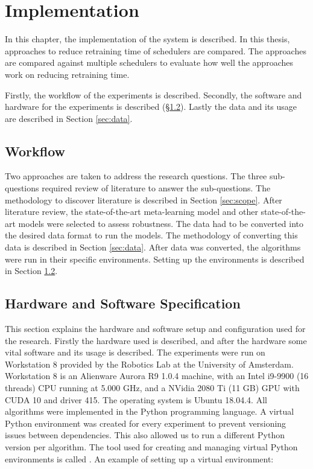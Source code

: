 \chapter{Implementation}\label{sec:method}

In this chapter, the implementation of the system is described. In this
thesis, approaches to reduce retraining time of \rlbased schedulers are
compared. The approaches are compared against multiple \rlbased schedulers to
evaluate how well the approaches work on reducing retraining time.

Firstly, the workflow of the experiments is described. Secondly, the software
and hardware for the experiments is described (§\ref{sec:setup}). Lastly the
data and its usage are described in Section \ref{sec:data}.

\section{Workflow}

Two approaches are taken to address the research questions. The three
sub-questions required review of literature to answer the sub-questions. The
methodology to discover literature is described in Section \ref{sec:scope}.
After literature review, the state-of-the-art meta-learning model and other
state-of-the-art \rl models were selected to assess robustness. The data had
to be converted into the desired data format to run the models. The
methodology of converting this data is described in Section \ref{sec:data}.
After data was converted, the algorithms were run in their specific
environments. Setting up the environments is described in Section
\ref{sec:setup}.


\section{Hardware and Software Specification}\label{sec:setup}

This section explains the hardware and software setup and configuration used
for the research. Firstly the hardware used is described, and after the
hardware some vital software and its usage is described. The experiments were
run on Workstation 8 provided by the Robotics Lab at the University of
Amsterdam. Workstation 8 is an Alienware Aurora R9 1.0.4 machine, with an
Intel i9-9900 (16 threads) CPU running at 5.000 GHz, and a NVidia 2080 Ti (11
GB) GPU with CUDA 10 and driver 415. The operating system is Ubuntu 18.04.4.
All algorithms were implemented in the Python programming
language. A virtual Python environment was created for
every experiment to prevent versioning issues between dependencies. This also
allowed us to run a different Python version per algorithm. The tool used for
creating and managing virtual Python environments is called
. An example of setting up a
virtual environment:

